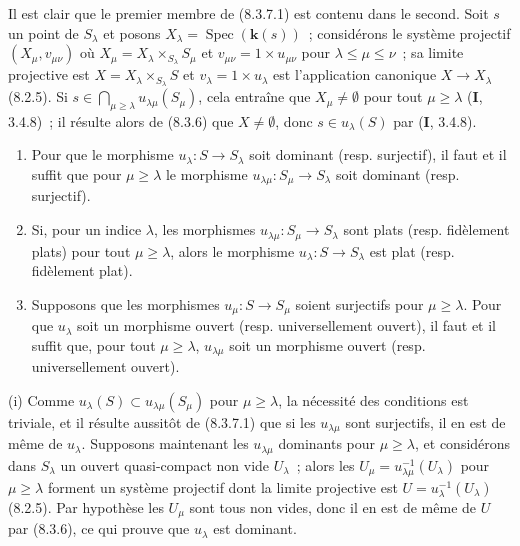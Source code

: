 Il est clair que le premier membre de (8.3.7.1) est contenu dans le second.
Soit $s$ un point de $S_\lambda$ et posons
$X_\lambda=\operatorname{Spec}(\boldsymbol{k}(s))$~; considérons le système projectif
$(X_\mu,v_{\mu\nu})$ où
$X_\mu=X_\lambda\times_{S_\lambda}S_\mu$ et
$v_{\mu\nu}=1\times u_{\mu\nu}$ pour
$\lambda\leq\mu\leq\nu$~; sa limite projective est
$X=X_\lambda\times_{S_\lambda}S$ et $v_\lambda=1\times u_\lambda$ est
l'application canonique $X\to X_\lambda$ (8.2.5). Si
$s\in\bigcap_{\mu\geq\lambda}u_{\lambda\mu}(S_\mu)$, cela entraîne que
$X_\mu\neq\emptyset$ pour tout $\mu\geq\lambda$ (\textbf{I}, 3.4.8)~; il résulte
alors de (8.3.6) que $X\neq\emptyset$, donc $s\in u_\lambda(S)$ par
(\textbf{I}, 3.4.8).

\begin{proposition}[8.3.8]
\label{IV.8.3.8-fr}
\begin{enumerate}
\item[\textup{(i)}] Pour que le morphisme $u_\lambda:S\to S_\lambda$ soit dominant
\textup{(resp.} surjectif\textup{)}, il faut et il suffit que pour $\mu\geq\lambda$ le
morphisme $u_{\lambda\mu}:S_\mu\to S_\lambda$ soit dominant \textup{(resp.}
surjectif\textup{)}.
\item[\textup{(ii)}] Si, pour un indice $\lambda$, les morphismes
$u_{\lambda\mu}:S_\mu\to S_\lambda$ sont plats \textup{(resp.} fidèlement plats\textup{)}
pour tout $\mu\geq\lambda$, alors le morphisme
$u_\lambda:S\to S_\lambda$ est plat \textup{(resp.} fidèlement plat\textup{)}.
\item[\textup{(iii)}] Supposons que les morphismes $u_\mu:S\to S_\mu$ soient
surjectifs pour $\mu\geq\lambda$. Pour que $u_\lambda$ soit un morphisme
ouvert \textup{(resp.} universellement ouvert\textup{)}, il faut et il suffit que, pour tout
$\mu\geq\lambda$, $u_{\lambda\mu}$ soit un morphisme ouvert \textup{(resp.}
universellement ouvert\textup{)}.
\end{enumerate}
\end{proposition}

\noindent
(i) Comme $u_\lambda(S)\subset u_{\lambda\mu}(S_\mu)$ pour
$\mu\geq\lambda$, la nécessité des conditions est triviale, et il résulte
aussitôt de (8.3.7.1) que si les $u_{\lambda\mu}$ sont surjectifs, il en est
de même de $u_\lambda$. Supposons maintenant les $u_{\lambda\mu}$ dominants
pour $\mu\geq\lambda$, et considérons dans $S_\lambda$ un ouvert
quasi-compact non vide $U_\lambda$~; alors les
$U_\mu=u_{\lambda\mu}^{-1}(U_\lambda)$ pour $\mu\geq\lambda$ forment un
système projectif dont la limite projective est
$U=u_\lambda^{-1}(U_\lambda)$ (8.2.5). Par hypothèse les $U_\mu$ sont tous
non vides, donc il en est de même de $U$ par (8.3.6), ce qui prouve que
$u_\lambda$ est dominant.

